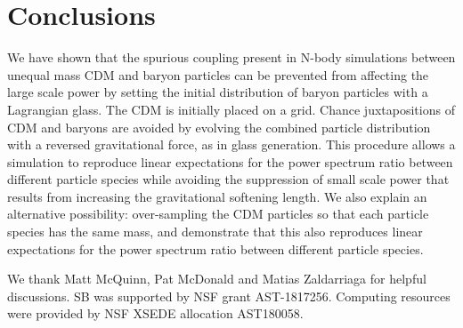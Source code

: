 \documentclass[a4paper,11pt]{article}
\begin{document}
\section{Conclusions}

We have shown that the spurious coupling present in N-body simulations between unequal mass CDM and baryon particles can be prevented from affecting the large scale power by setting the initial distribution of baryon particles with a Lagrangian glass. The CDM is initially placed on a grid. Chance juxtapositions of CDM and baryons are avoided by evolving the combined particle distribution with a reversed gravitational force, as in glass generation. This procedure allows a simulation to reproduce linear expectations for the power spectrum ratio between different particle species while avoiding the suppression of small scale power that results from increasing the gravitational softening length. We also explain an alternative possibility: over-sampling the CDM particles so that each particle species has the same mass, and demonstrate that this also reproduces linear expectations for the power spectrum ratio between different particle species.

\acknowledgments

We thank Matt McQuinn, Pat McDonald and Matias Zaldarriaga for helpful discussions. SB was supported by NSF grant AST-1817256. Computing resources were provided by NSF XSEDE allocation AST180058.



\end{document}
